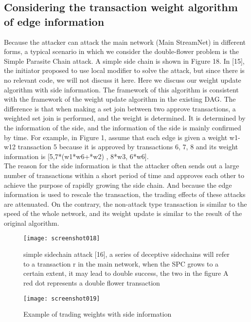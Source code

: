 \documentclass{article}
\begin{document}
\subsection{Considering the transaction weight algorithm of edge information}
Because the attacker can attack the main network (Main StreamNet) in different forms, a typical scenario in which we consider the double-flower problem is the Simple Parasite Chain attack. A simple side chain is shown in Figure 18. In [15], the initiator proposed to use local modifier to solve the attack, but since there is no relevant code, we will not discuss it here. Here we discuss our weight update algorithm with side information. The framework of this algorithm is consistent with the framework of the weight update algorithm in the existing DAG. The difference is that when making a set join between two approve transactions, a weighted set join is performed, and the weight is determined. It is determined by the information of the side, and the information of the side is mainly confirmed by time. For example, in Figure 1, assume that each edge is given a weight w1-w12 transaction 5 because it is approved by transactions 6, 7, 8 and its weight information is [5,7*(w1*w6+*w2) , 8*w3, 6*w6]. \\
\indent The reason for the side information is that the attacker often sends out a large number of transactions within a short period of time and approves each other to achieve the purpose of rapidly growing the side chain. And because the edge information is used to rescale the transaction, the trading effects of these attacks are attenuated. On the contrary, the non-attack type transaction is similar to the speed of the whole network, and its weight update is similar to the result of the original algorithm.

\begin{figure}[H]
	\centering
	\texttt{[image: screenshot018]}
	\caption{simple sidechain attack [16], a series of deceptive sidechains will refer to a transaction r in the main network, when the SPC grows to a certain extent, it may lead to double success, the two in the figure A red dot represents a double flower transaction}
	\label{simulationfigure}
\end{figure}

\begin{figure}[H]
	\centering
	\texttt{[image: screenshot019]}
	\caption{Example of trading weights with side information}
	\label{simulationfigure}
\end{figure}
\end{document}
